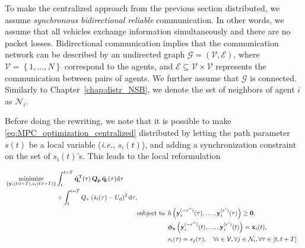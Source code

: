To make the centralized approach from the previous section distributed, we assume \emph{synchronous bidirectional reliable} communication.
In other words, we assume that all vehicles exchange information simultaneously and there are no packet losses.
Bidirectional communication implies that the communication network can be described by an undirected graph $\mathcal{G} = \left(\mathcal{V}, \mathcal{E}\right)$, where $\mathcal{V} = \left\{1, \ldots, N\right\}$ correspond to the agents, and $\mathcal{E} \subseteq \mathcal{V} \times \mathcal{V}$ represents the communication between pairs of agents. We further assume that $\mathcal{G}$ is connected.
Similarly to Chapter~\ref{chap:distr_NSB}, we denote the set of neighbors of agent $i$ as $\mathcal{N}_i$.

Before doing the rewriting, we note that it is possible to make \eqref{eq:MPC_optimization_centralized} distributed by letting the path parameter $s(t)$ be a local variable (\emph{i.e.}, $s_i(t)$), and adding a synchronization constraint on the set of $s_i(t)$'s. This leads to the local reformulation

\begin{subequations}
    \begin{align}
        \begin{split}
            &\opt_{ \left\lbrace \mat{y}_i(t:t+T), s_i(t:t+T) \right\rbrace }
            \int_{t}^{t+T}
                \widetilde{\mat{q}}_i\T(\tau)
                \, \bm{Q}_{\mat{p}} \, 
                \widetilde{\mat{q}}_i(\tau)
                {\rm d}\tau \\
            & \qquad \qquad \qquad \qquad
            + \int_{t}^{t+T} Q_s \,\left(\dot{s}_i(\tau) - U_d\right)^2 {\rm d}\tau , 
        \end{split} \label{eq:MPC_criterion}\\
        & \text{subject to } \, h\left(\mat{y}_i^{(-r'')}(\tau), \ldots, \mat{y}^{(r')}_i(\tau)\right) \geq \bm{0}, \label{eq:MPC_constraint_h} \\
        & \phantom{\text{subject to } \,} \bm{\phi}_{\mat{x}} \left(\mat{y}_i^{(-r'')}(t), \ldots, \mat{y}^{(r')}_i(t)\right) = \mat{x}_{i}(t), \label{eq:MPC_constraint_x0} \\
        & \phantom{\text{subject to } \,} s_i(\tau) = s_j(\tau), \quad \forall i \in \mathcal{V}, \forall j \in \mathcal{N}_i, \forall \tau \in [t, t+T] \label{eq:MPC_constraint_gamma_s}
    \end{align}
\label{eq:MPC_optimization_distributed}

\end{subequations}

